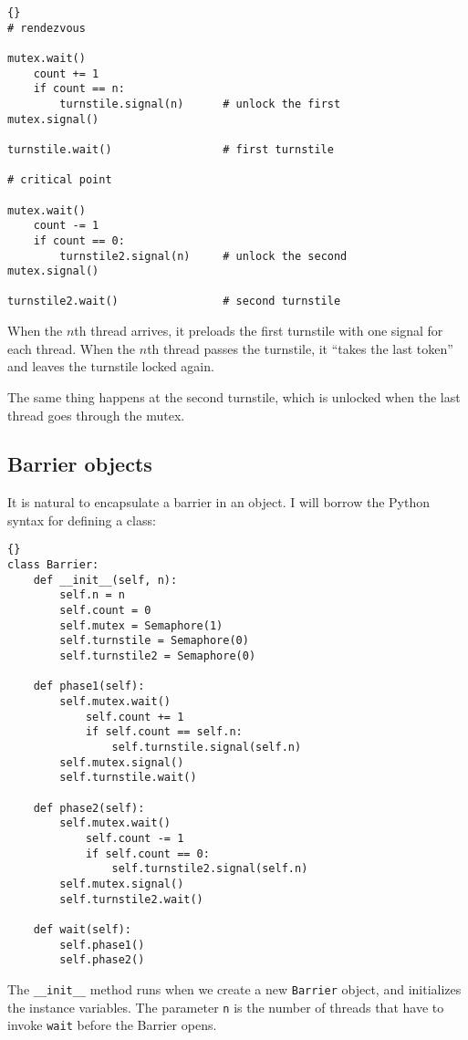 \documentclass{book}
\begin{document}
\begin{lstlisting}[title={Reusable barrier solution}]{}
# rendezvous

mutex.wait()
    count += 1
    if count == n:
        turnstile.signal(n)      # unlock the first
mutex.signal()

turnstile.wait()                 # first turnstile

# critical point

mutex.wait()
    count -= 1
    if count == 0:
        turnstile2.signal(n)     # unlock the second
mutex.signal()

turnstile2.wait()                # second turnstile
\end{lstlisting}

When the $n$th thread arrives, it preloads the first turnstile with
one signal for each thread.  When the $n$th thread passes the
turnstile, it ``takes the last token'' and leaves the turnstile locked
again.

The same thing happens at the second turnstile, which is
unlocked when the last thread goes through the mutex.


\newpage
\subsection {Barrier objects}

It is natural to encapsulate a barrier in an object.  I will
borrow the Python syntax for defining a class:

\begin{lstlisting}[title={Barrier class}]{}
class Barrier:
    def __init__(self, n):
        self.n = n
        self.count = 0
        self.mutex = Semaphore(1)
        self.turnstile = Semaphore(0)
        self.turnstile2 = Semaphore(0)

    def phase1(self):
        self.mutex.wait()
            self.count += 1
            if self.count == self.n:
                self.turnstile.signal(self.n) 
        self.mutex.signal()
        self.turnstile.wait()            

    def phase2(self):
        self.mutex.wait()
            self.count -= 1
            if self.count == 0:
                self.turnstile2.signal(self.n)
        self.mutex.signal()
        self.turnstile2.wait()

    def wait(self):
        self.phase1()
        self.phase2()
\end{lstlisting}

The {\tt \_\_init\_\_} method runs when we create a new
{\tt Barrier} object, and initializes the instance variables.
The parameter {\tt n} is the number of threads that have
to invoke {\tt wait} before the Barrier opens.
\end{document}
